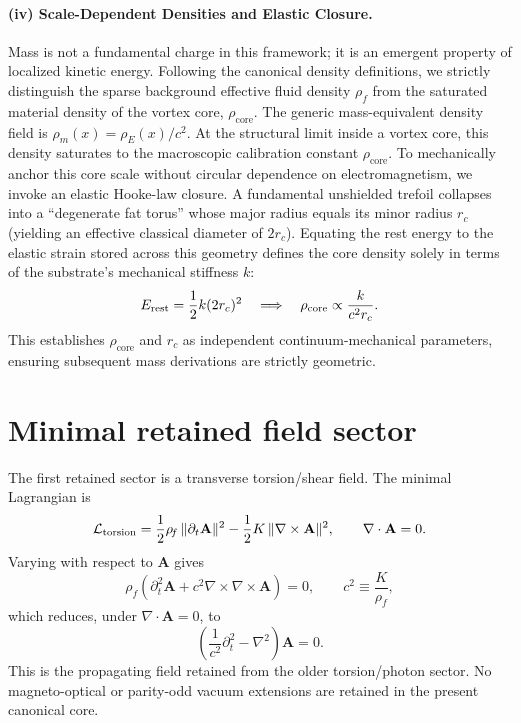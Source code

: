 \documentclass[11pt,a4paper]{article}
\newcommand{\rc}{r_c}
\newcommand{\rhoF}{\rho_{\!f}}
\newcommand{\rhoE}{\rho_{\!E}}
\newcommand{\rhoM}{\rho_{\!m}}
\newcommand{\rhocore}{\rho_{\text{core}}}
\begin{document}
        \paragraph{(iv) Scale-Dependent Densities and Elastic Closure.}
            Mass is not a fundamental charge in this framework; it is an emergent property of localized kinetic energy. Following the canonical density definitions, we strictly distinguish the sparse background effective fluid density $\rhoF$ from the saturated material density of the vortex core, $\rhocore$. The generic mass-equivalent density field is $\rhoM(x) = \rhoE(x)/c^2$. At the structural limit inside a vortex core, this density saturates to the macroscopic calibration constant $\rhocore$.
            To mechanically anchor this core scale without circular dependence on electromagnetism, we invoke an elastic Hooke-law closure. A fundamental unshielded trefoil collapses into a ``degenerate fat torus'' whose major radius equals its minor radius $\rc$ (yielding an effective classical diameter of $2\rc$). Equating the rest energy to the elastic strain stored across this geometry defines the core density solely in terms of the substrate's mechanical stiffness $k$:
            \begin{equation}
                \label{eq:ElasticClosure}
                E_{\rm rest} = \frac{1}{2} k (2\rc)^2 \quad \Longrightarrow \quad \rhocore \propto \frac{k}{c^2 \rc}.
            \end{equation}
            This establishes $\rhocore$ and $\rc$ as independent continuum-mechanical parameters, ensuring subsequent mass derivations are strictly geometric.
    
    \section{Minimal retained field sector}
    \label{sec:field-sector}
    The first retained sector is a transverse torsion/shear field. The minimal Lagrangian is
    \begin{equation}
        \label{eq:Ltorsion}
        \mathcal{L}_{\rm torsion}
        =
        \frac12\rhoF\,\lVert \partial_t \mathbf{A}\rVert^2
        -
        \frac12 K\,\lVert \nabla\times\mathbf{A}\rVert^2,
        \qquad
        \nabla\cdot\mathbf{A}=0.
    \end{equation}
    Varying with respect to $\mathbf{A}$ gives
    \begin{equation}
        \label{eq:Awave-pre}
        \rhoF\left(\partial_t^2\mathbf{A}+c^2\nabla\times\nabla\times\mathbf{A}\right)=0,
        \qquad
        c^2\equiv \frac{K}{\rhoF},
    \end{equation}
    which reduces, under $\nabla\cdot\mathbf{A}=0$, to
    \begin{equation}
        \label{eq:Awave}
        \boxed{
            \left(\frac{1}{c^2}\partial_t^2-\nabla^2\right)\mathbf{A}=0.
        }
    \end{equation}
    This is the propagating field retained from the older torsion/photon sector. No magneto-optical or parity-odd vacuum extensions are retained in the present canonical core.
    
\end{document}
